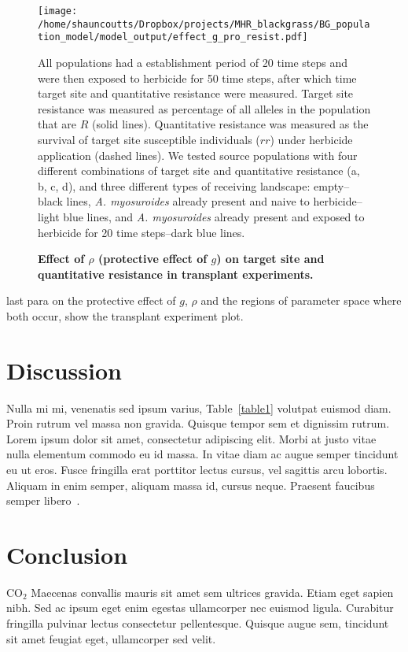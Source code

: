 \documentclass[10pt,letterpaper]{article}
\begin{document}
\begin{figure}[!h] 
	\texttt{[image: /home/shauncoutts/Dropbox/projects/MHR\_blackgrass/BG\_population\_model/model\_output/effect\_g\_pro\_resist.pdf]}
\caption{\bf Effect of $\rho$ (protective effect of $g$) on target site and quantitative resistance in transplant experiments.} All populations had a establishment period of 20 time steps and were then exposed to herbicide for 50 time steps, after which time target site and quantitative resistance were measured. Target site resistance was measured as percentage of all alleles in the population that are $R$ (solid lines). Quantitative resistance was measured as the survival of target site susceptible individuals ($rr$) under herbicide application (dashed lines). We tested source populations with four different combinations of target site and quantitative resistance (a, b, c, d), and three different types of receiving landscape: empty--black lines, \textit{A. myosuroides} already present and naive to herbicide--light blue lines, and \textit{A. myosuroides} already present and exposed to herbicide for 20 time steps--dark blue lines.        
\label{fig:transloc_gpro}
\end{figure}



last para on the protective effect of $g$, $\rho$ and the regions of parameter space where both occur, show the transplant experiment plot.

\section*{Discussion}
Nulla mi mi, venenatis sed ipsum varius, Table~\ref{table1} volutpat euismod diam. Proin rutrum vel massa non gravida. Quisque tempor sem et dignissim rutrum. Lorem ipsum dolor sit amet, consectetur adipiscing elit. Morbi at justo vitae nulla elementum commodo eu id massa. In vitae diam ac augue semper tincidunt eu ut eros. Fusce fringilla erat porttitor lectus cursus, vel sagittis arcu lobortis. Aliquam in enim semper, aliquam massa id, cursus neque. Praesent faucibus semper libero~\cite{bib3}.

\section*{Conclusion}

CO$_2$ Maecenas convallis mauris sit amet sem ultrices gravida. Etiam eget sapien nibh. Sed ac ipsum eget enim egestas ullamcorper nec euismod ligula. Curabitur fringilla pulvinar lectus consectetur pellentesque. Quisque augue sem, tincidunt sit amet feugiat eget, ullamcorper sed velit. 
\end{document}
